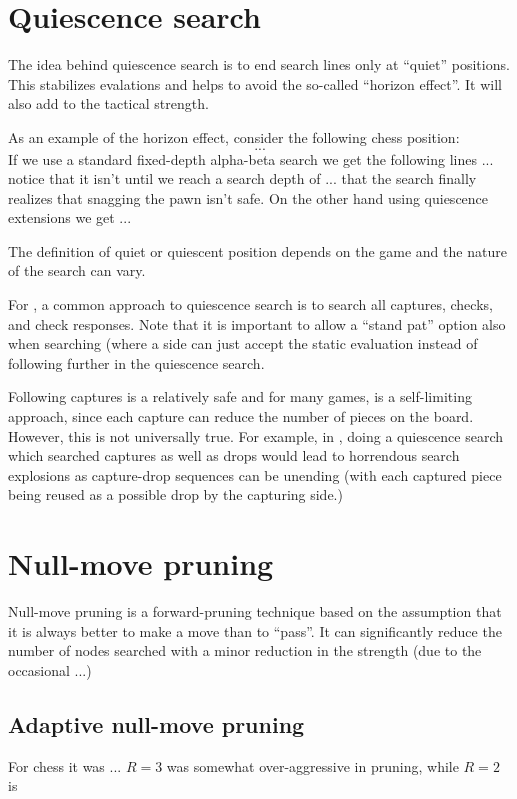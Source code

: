 \documentclass[10pt,dvipdfmx,letterpaper]{report}
\newcommand{\g}[1]{{\sc{#1}}\index{{\sc{#1}}}}
\begin{document}
\section{Quiescence search}

The idea behind quiescence search is to end search lines only at ``quiet'' positions.
This stabilizes evalations and helps to avoid the so-called ``horizon effect''.
It will also add to the tactical strength.

As an example of the horizon effect, consider the following chess position:
\[ ... \]
If we use a standard fixed-depth alpha-beta search we get the following lines ...
notice that it isn't until we reach a search depth of ... that the search finally
realizes that snagging the pawn isn't safe.
On the other hand using quiescence extensions we get ...

The definition of quiet or quiescent position depends on the game and the nature
of the search can vary.

For \g{chess}, a common approach to quiescence search is
to search all captures, checks,
and check responses.  Note that it is important to allow a ``stand pat'' option also when
searching (where a side can just accept the static evaluation instead of following
further in the quiescence search.

Following captures is a relatively safe and for many games, is a self-limiting approach,
since each capture can reduce the number of pieces on the board.  However, this is not
universally true.
For example, in \g{shogi}, doing a quiescence search which searched captures as well as drops would
lead to horrendous search explosions as capture-drop sequences can be unending
(with each captured piece being reused as a possible drop by the capturing side.)

\section{Null-move pruning}
Null-move pruning is a forward-pruning technique based on the assumption that it
is always better to make a move than to ``pass''.
It can significantly reduce the number of nodes searched with a minor reduction
in the strength (due to the occasional ...)

\subsection{Adaptive null-move pruning}
For chess it was ...
$R=3$ was somewhat over-aggressive in pruning,
while $R=2$ is
\end{document}
